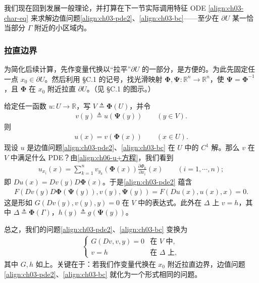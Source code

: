 \documentclass[../../main.tex]{subfiles}
\begin{document}
我们现在回到发展一般理论，并打算在下一节实际调用特征 ODE \eqref{align:ch03-char-eq} 来求解边值问题\eqref{align:ch03-pde2}、\eqref{align:ch03-bc}——至少在 $\partial U$ 某一恰当部分 $\Gamma$ 附近的小区域内。

\subsubsection{拉直边界}

为简化后续计算，先作变量代换以``拉平''$\partial U$ 的一部分，是方便的。为此先固定任一点 $x_0\in\partial U$。然后利用 \S C.1 的记号，找光滑映射 $\boldsymbol{\Phi},\boldsymbol{\Psi}:\mathbb{R}^n\to\mathbb{R}^n$，使 $\boldsymbol{\Psi}=\boldsymbol{\Phi}^{-1}$，且 $\boldsymbol{\Phi}$ 在 $x_0$ 附近拉直 $\partial U$。（见 \S C.1 的图示。）

给定任一函数 $u:U\to\mathbb{R}$，写 $V\triangleq\boldsymbol{\Phi}(U)$，并令
\begin{align}\label{align:ch03-v}
v(y)\triangleq u(\boldsymbol{\Psi}(y)) \qquad (y\in V).
\end{align}
则
\begin{align}\label{align:ch06-u+方程}
u(x)=v(\boldsymbol{\Phi}(x)) \qquad (x\in U).
\end{align}
现设 $u$ 是边值问题\eqref{align:ch03-pde2}、\eqref{align:ch03-bc} 在 $U$ 中的 $C^1$ 解。那么 $v$ 在 $V$ 中满足什么 PDE？由\eqref{align:ch06-u+方程}，我们看到
\begin{align*}
u_{x_i}(x)=\sum_{k=1}^n v_{y_k}(\boldsymbol{\Phi}(x))\frac{\partial\Phi_k}{\partial x_i}(x) \qquad (i=1,\cdots,n);
\end{align*}
即 $Du(x)=Dv(y)D\boldsymbol{\Phi}(x)$。于是\eqref{align:ch03-pde2} 蕴含
\begin{align}\label{align:ch03-transformed}
F(Dv(y)D\boldsymbol{\Phi}(\boldsymbol{\Psi}(y)),v(y),\boldsymbol{\Psi}(y))=F(Du(x),u(x),x)=0.
\end{align}
这是形如 $G(Dv(y),v(y),y)=0$ 在 $V$ 中的表达式。此外在 $\Delta$ 上 $v=h$，其中 $\Delta\triangleq\boldsymbol{\Phi}(\Gamma)$，$h(y)\triangleq g(\boldsymbol{\Psi}(y))$。

总之，我们的问题\eqref{align:ch03-pde2}、\eqref{align:ch03-bc} 变换为
\begin{align}\label{align:ch03-transformed-exercise}
\begin{cases}
G(Dv,v,y)=0 & \text{在 }V\text{ 中},\\
v=h & \text{在 }\Delta\text{ 上},
\end{cases}
\end{align}
其中 $G,h$ 如上。关键在于：若我们作变量代换在 $x_0$ 附近拉直边界，边值问题\eqref{align:ch03-pde2}、\eqref{align:ch03-bc} 就化为一个形式相同的问题。
\end{document}
